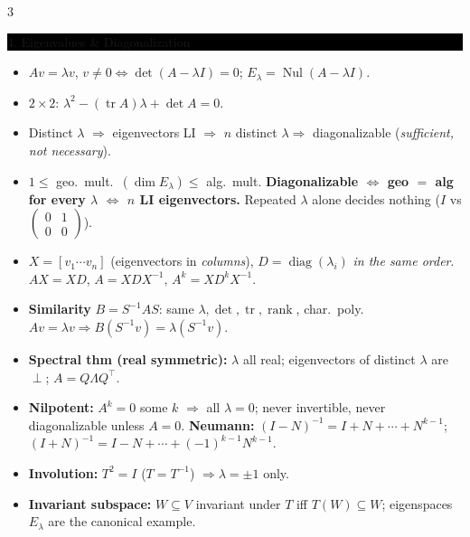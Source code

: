 \documentclass[8pt,letterpaper]{article}
\makeatletter
\newcommand{\sect}[1]{%
  \vspace{2.2pt}%
  \noindent\colorbox{black}{\parbox{\dimexpr\linewidth-2\fboxsep}{%
    \color{white}\bfseries\scshape\fontsize{6.4}{7.4}\selectfont
    \hyphenpenalty=10000\exhyphenpenalty=10000\raggedright #1}}%
  \vspace{1.4pt}\par\nopagebreak\@afterheading}
\newenvironment{tl}
  {\begin{itemize}[leftmargin=6pt,itemsep=0.3pt,topsep=1pt,parsep=0pt,
                   partopsep=0pt,label=\textcolor{gray}{\tiny$\bullet$}]}
  {\end{itemize}}
\newcommand{\tr}{\operatorname{tr}}
\newcommand{\rank}{\operatorname{rank}}
\newcommand{\tp}{^{\!\top}}
\makeatother
\begin{document}
\begin{multicols}{3}
\sect{4. Eigenvalues \& Diagonalization}
\begin{tl}
\item $Av=\lambda v$, $v\neq0 \iff \det(A-\lambda I)=0$; $E_\lambda=\operatorname{Nul}(A-\lambda I)$.
\item $2\times2$: $\lambda^2-(\tr A)\lambda+\det A=0$.
\item Distinct $\lambda$ $\Rightarrow$ eigenvectors LI $\Rightarrow$ $n$ distinct $\lambda\Rightarrow$ diagonalizable (\emph{sufficient, not necessary}).
\item $1\le$ geo.\ mult.\ $(\dim E_\lambda)\le$ alg.\ mult. \textbf{Diagonalizable $\iff$ geo $=$ alg for every $\lambda$ $\iff$ $n$ LI eigenvectors.} Repeated $\lambda$ alone decides nothing ($I$ vs $\left(\begin{smallmatrix}0&1\\0&0\end{smallmatrix}\right)$).
\item $X=[v_1\cdots v_n]$ (eigenvectors in \emph{columns}), $D=\operatorname{diag}(\lambda_i)$ \emph{in the same order}. $AX=XD$, $A=XDX^{-1}$, \textbf{$A^k=XD^kX^{-1}$}.
\item \textbf{Similarity} $B=S^{-1}AS$: same $\lambda,\det,\tr,\rank$, char.\ poly. $Av=\lambda v\Rightarrow B(S^{-1}v)=\lambda(S^{-1}v)$.
\item \textbf{Spectral thm (real symmetric):} $\lambda$ all real; eigenvectors of distinct $\lambda$ are $\perp$; $A=Q\Lambda Q\tp$.
\item \textbf{Nilpotent:} $A^k=0$ some $k$ $\Rightarrow$ all $\lambda=0$; never invertible, never diagonalizable unless $A=0$. \textbf{Neumann:} $(I-N)^{-1}=I+N+\cdots+N^{k-1}$; $(I+N)^{-1}=I-N+\cdots+(-1)^{k-1}N^{k-1}$.
\item \textbf{Involution:} $T^2=I$ ($T=T^{-1}$) $\Rightarrow\lambda=\pm1$ only.
\item \textbf{Invariant subspace:} $W\subseteq V$ invariant under $T$ iff $T(W)\subseteq W$; eigenspaces $E_\lambda$ are the canonical example.
\end{tl}


\end{multicols}
\end{document}

